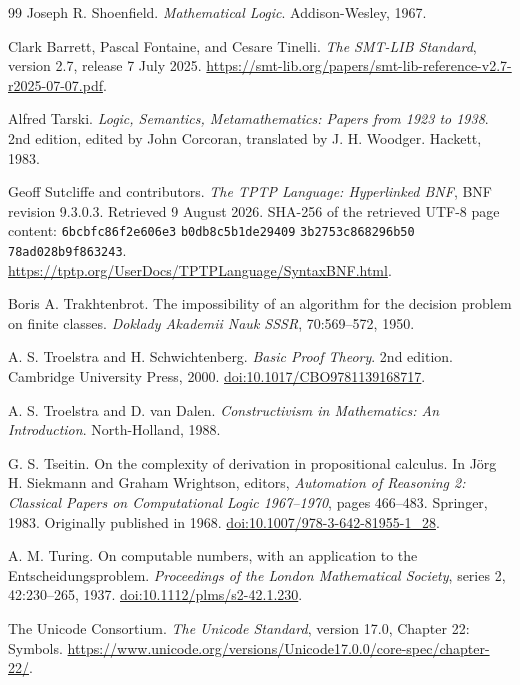 \begin{thebibliography}{99}
Joseph R. Shoenfield.
\emph{Mathematical Logic}.
Addison-Wesley, 1967.

Clark Barrett, Pascal Fontaine, and Cesare Tinelli.
\emph{The SMT-LIB Standard}, version 2.7, release 7 July 2025.
\url{https://smt-lib.org/papers/smt-lib-reference-v2.7-r2025-07-07.pdf}.

Alfred Tarski.
\emph{Logic, Semantics, Metamathematics: Papers from 1923 to 1938}.
2nd edition, edited by John Corcoran, translated by J. H. Woodger.
Hackett, 1983.

Geoff Sutcliffe and contributors.
\emph{The TPTP Language: Hyperlinked BNF}, BNF revision 9.3.0.3.
Retrieved 9 August 2026.
SHA-256 of the retrieved UTF-8 page content:
\texttt{6bcbfc86f2e606e3}\allowbreak
\texttt{b0db8c5b1de29409}\allowbreak
\texttt{3b2753c868296b50}\allowbreak
\texttt{78ad028b9f863243}.
\url{https://tptp.org/UserDocs/TPTPLanguage/SyntaxBNF.html}.

Boris A. Trakhtenbrot.
The impossibility of an algorithm for the decision problem on finite classes.
\emph{Doklady Akademii Nauk SSSR}, 70:569--572, 1950.

A. S. Troelstra and H. Schwichtenberg.
\emph{Basic Proof Theory}. 2nd edition.
Cambridge University Press, 2000.
\href{https://doi.org/10.1017/CBO9781139168717}{doi:10.1017/CBO9781139168717}.

A. S. Troelstra and D. van Dalen.
\emph{Constructivism in Mathematics: An Introduction}.
North-Holland, 1988.

G. S. Tseitin.
On the complexity of derivation in propositional calculus.
In J\"org H. Siekmann and Graham Wrightson, editors,
\emph{Automation of Reasoning 2: Classical Papers on Computational Logic
1967--1970}, pages 466--483.  Springer, 1983.  Originally published in 1968.
\href{https://doi.org/10.1007/978-3-642-81955-1_28}{doi:10.1007/978-3-642-81955-1\_28}.

A. M. Turing.
On computable numbers, with an application to the Entscheidungsproblem.
\emph{Proceedings of the London Mathematical Society}, series 2, 42:230--265,
1937.
\href{https://doi.org/10.1112/plms/s2-42.1.230}{doi:10.1112/plms/s2-42.1.230}.

The Unicode Consortium.
\emph{The Unicode Standard}, version 17.0, Chapter 22: Symbols.
\url{https://www.unicode.org/versions/Unicode17.0.0/core-spec/chapter-22/}.

\end{thebibliography}

